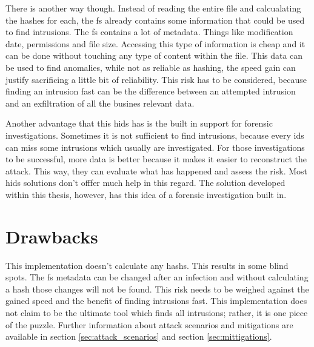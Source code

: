 There is another way though. Instead of reading the entire file and calcualating the hashes for each, the \gls{fs} already contains some information that could be used to find \glspl{intrusion}. The \gls{fs} contains a lot of \gls{metadata}. Things like modification date, permissions and file size. Accessing this type of information is cheap and it can be done without touching any type of content within the file. This data can be used to find anomalies, while not as reliable as hashing, the speed gain can justify sacrificing a little bit of reliability. This risk has to be considered, because finding an intrusion fast can be the difference between an attempted intrusion and an exfiltration of all the busines relevant data. \cite{inode}

Another advantage that this \gls{hids} has is the built in support for forensic investigations. Sometimes it is not sufficient to find intrusions, because every \gls{ids} can miss some intrusions which usually are investigated. For those investigations to be successful, more data is better because it makes it easier to reconstruct the attack. This way, they can evaluate what has happened and assess the risk. Most \gls{hids} solutions don't offfer much help in this regard. The solution developed within this thesis, however, has this idea of a forensic investigation built in.

\section{Drawbacks}

This implementation doesn't calculate any \glspl{hash}. This results in some blind spots. The \gls{fs} \gls{metadata} can be changed after an infection and without calculating a \gls{hash} those changes will not be found. \cite{changing:attributes} This risk needs to be weighed against the gained speed and the benefit of finding intrusions fast. This implementation does not claim to be the ultimate tool which finds all intrusions; rather, it is one piece of the puzzle. Further information about attack scenarios and mitigations are available in section \ref{sec:attack_scenarios} and section \ref{sec:mittigations}.
